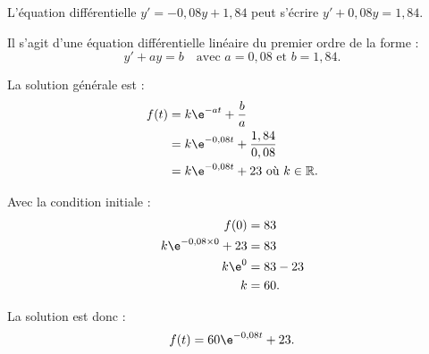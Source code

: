 \medskip

L'équation différentielle $y' = - 0,08y + 1,84$ peut s'écrire $y' + 0,08y = 1,84$.
    
Il s'agit d'une équation différentielle linéaire du premier ordre de la forme :
\[y' + ay = b \quad \text{avec } a = 0,08 \text{ et } b = 1,84.\]

La solution générale est :
\begin{align*}
f(t) &= k\e^{-at} + \dfrac{b}{a} \\
&= k\e^{-0,08t} + \dfrac{1,84}{0,08} \\
&= k\e^{-0,08t} + 23 \text{ où } k \in \mathbb{R}.
\end{align*}

Avec la condition initiale :
\begin{align*}
f(0) &= 83 \\
k\e^{-0,08\times0} + 23 &= 83 \\
k\e^0 &= 83 - 23 \\
k &= 60.
\end{align*}

La solution est donc :
\[f(t) = 60\e^{-0,08t} + 23.\]

\bigskip
